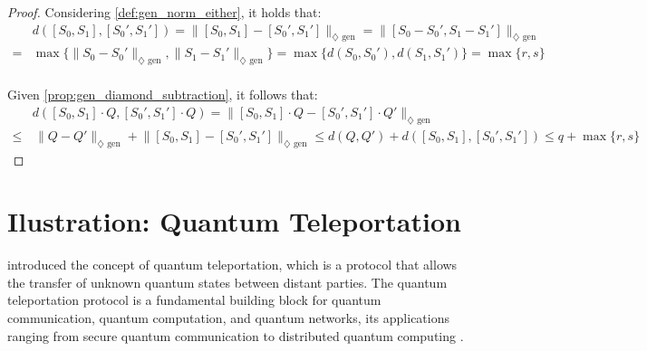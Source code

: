\begin{proof}
  Considering \autoref{def:gen_norm_either}, it holds that:
  \begin{equation}
    \begin{split}
      &d( [S_0,S_1], [S_0',S_1']) = \lVert [S_0,S_1] - [S_0',S_1']   \rVert_{\diamondsuit  \text{ gen}} =  \lVert [S_0-S_0',S_1-S_1']   \rVert_{\diamondsuit \text{ gen}} \\
      = &  \max\{ \lVert S_0-S_0'  \rVert_{\diamondsuit \text{ gen}},\lVert S_1-S_1'  \rVert_{\diamondsuit \text{ gen}}\} = \max \{d(S_0,S_0'),d(S_1,S_1') \} = \max \{ r,s \}\\
    \end{split}
  \end{equation}

  Given \autoref{prop:gen_diamond_subtraction}, it follows that:
  \begin{equation}
    \begin{split}
    & d( [S_0,S_1] \cdot Q, [S_0',S_1'] \cdot Q) = \lVert [S_0,S_1] \cdot Q - [S_0',S_1'] \cdot Q' \rVert_{\diamondsuit \text{ gen}} \\
    \leq & \hspace{2pt} \lVert Q - Q' \rVert_{\diamondsuit \text{ gen}} + \lVert [S_0,S_1] - [S_0',S_1'] \rVert_{\diamondsuit \text{ gen}}  \leq d(Q,Q') +  d( [S_0,S_1], [S_0',S_1'])\leq q + \max\{r,s\}
    \end{split}
  \end{equation}

\end{proof}


\section{Ilustration: Quantum Teleportation} \label{sec:teleport}

\cite{bennett1993teleporting} introduced the concept of quantum teleportation, which is a protocol that allows the transfer of   unknown quantum states between distant parties.  The quantum teleportation protocol is a fundamental building block for quantum communication, quantum computation, and quantum networks, its applications ranging
from secure quantum communication to distributed quantum computing \cite{briegel1998quantum,gottesman1999demonstrating,kimble2008quantum}. %

